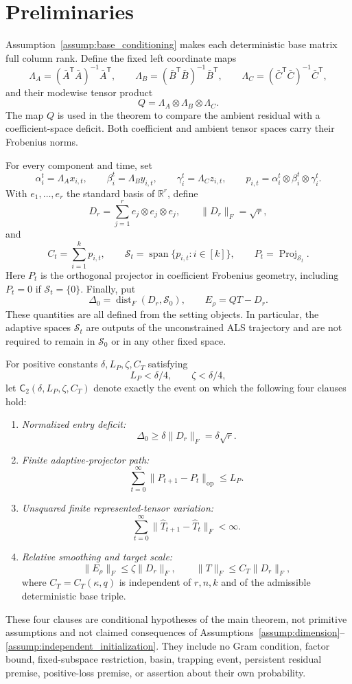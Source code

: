 \section{Preliminaries}\label{sec:preliminaries}

Assumption~\ref{assump:base_conditioning} makes each deterministic base
matrix full column rank.  Define the fixed left coordinate maps
\[
\Lambda_A=(\bar A^{\mathsf T}\bar A)^{-1}\bar A^{\mathsf T},
\qquad
\Lambda_B=(\bar B^{\mathsf T}\bar B)^{-1}\bar B^{\mathsf T},
\qquad
\Lambda_C=(\bar C^{\mathsf T}\bar C)^{-1}\bar C^{\mathsf T},
\]
and their modewise tensor product
\[
Q=\Lambda_A\otimes\Lambda_B\otimes\Lambda_C.
\]
The map $Q$ is used in the theorem to compare the ambient residual with a
coefficient-space deficit.  Both coefficient and ambient tensor spaces carry
their Frobenius norms.

For every component and time, set
\[
\alpha_i^t=\Lambda_Ax_{i,t},
\qquad
\beta_i^t=\Lambda_By_{i,t},
\qquad
\gamma_i^t=\Lambda_Cz_{i,t},
\qquad
p_{i,t}=\alpha_i^t\otimes\beta_i^t\otimes\gamma_i^t.
\]
With $e_1,\ldots,e_r$ the standard basis of $\mathbb R^r$, define
\[
D_r=\sum_{j=1}^r e_j\otimes e_j\otimes e_j,
\qquad \|D_r\|_F=\sqrt r,
\]
and
\[
C_t=\sum_{i=1}^k p_{i,t},
\qquad
\mathcal S_t=\operatorname{span}\{p_{i,t}:i\in[k]\},
\qquad
P_t=\operatorname{Proj}_{\mathcal S_t}.
\]
Here $P_t$ is the orthogonal projector in coefficient Frobenius geometry,
including $P_t=0$ if $\mathcal S_t=\{0\}$.  Finally, put
\[
\Delta_0=\operatorname{dist}_F(D_r,\mathcal S_0),
\qquad
E_\rho=QT-D_r.
\]
These quantities are all defined from the setting objects.  In particular,
the adaptive spaces $\mathcal S_t$ are outputs of the unconstrained ALS
trajectory and are not required to remain in $\mathcal S_0$ or in any other
fixed space.

For positive constants $\delta,L_P,\zeta,C_T$ satisfying
\[
L_P<\delta/4,
\qquad
\zeta<\delta/4,
\]
let $\mathsf C_2(\delta,L_P,\zeta,C_T)$ denote exactly the event on which
the following four clauses hold:
\begin{enumerate}
\item \emph{Normalized entry deficit:}
\[
\Delta_0\geq\delta\|D_r\|_F=\delta\sqrt r.
\]
\item \emph{Finite adaptive-projector path:}
\[
\sum_{t=0}^{\infty}\|P_{t+1}-P_t\|_{\mathrm{op}}\leq L_P.
\]
\item \emph{Unsquared finite represented-tensor variation:}
\[
\sum_{t=0}^{\infty}\|\widehat T_{t+1}-\widehat T_t\|_F<\infty.
\]
\item \emph{Relative smoothing and target scale:}
\[
\|E_\rho\|_F\leq\zeta\|D_r\|_F,
\qquad
\|T\|_F\leq C_T\|D_r\|_F,
\]
where $C_T=C_T(\kappa,q)$ is independent of $r,n,k$ and of the admissible
deterministic base triple.
\end{enumerate}
These four clauses are conditional hypotheses of the main theorem, not
primitive assumptions and not claimed consequences of
Assumptions~\ref{assump:dimension}--\ref{assump:independent_initialization}.
They include no Gram condition, factor bound, fixed-subspace restriction,
basin, trapping event, persistent residual premise, positive-loss premise, or
assertion about their own probability.
